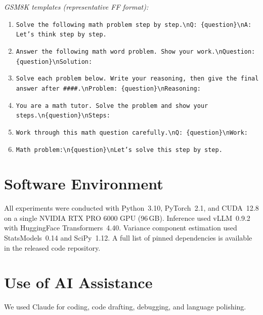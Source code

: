 \smallskip\noindent\textit{GSM8K templates (representative FF format):}
\begin{enumerate}\setlength{\itemsep}{0pt}\setlength{\parsep}{0pt}\setlength{\topsep}{0pt}
\item \texttt{Solve the following math problem step by step.\textbackslash nQ: \{question\}\textbackslash nA: Let's think step by step.}
\item \texttt{Answer the following math word problem. Show your work.\textbackslash nQuestion: \{question\}\textbackslash nSolution:}
\item \texttt{Solve each problem below. Write your reasoning, then give the final answer after \#\#\#\#.\textbackslash nProblem: \{question\}\textbackslash nReasoning:}
\item \texttt{You are a math tutor. Solve the problem and show your steps.\textbackslash n\{question\}\textbackslash nSteps:}
\item \texttt{Work through this math question carefully.\textbackslash nQ: \{question\}\textbackslash nWork:}
\item \texttt{Math problem:\textbackslash n\{question\}\textbackslash nLet's solve this step by step.}
\end{enumerate}

\section{Software Environment}
\label{app:software}

All experiments were conducted with Python~3.10, PyTorch~2.1, and CUDA~12.8 on a single NVIDIA RTX PRO 6000 GPU (96\,GB). Inference used vLLM~0.9.2 with HuggingFace Transformers~4.40. Variance component estimation used StatsModels~0.14 and SciPy~1.12. A full list of pinned dependencies is available in the released code repository.

\section{Use of AI Assistance}
We used Claude for coding, code drafting, debugging, and language polishing.
